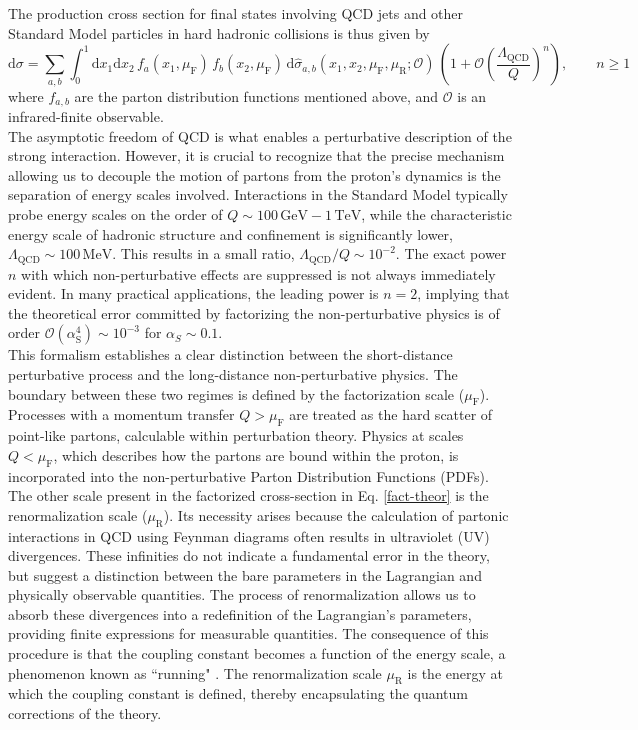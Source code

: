 \documentclass[a4paper, 12pt]{book}
\begin{document}
The production cross section for final states involving QCD jets and other Standard Model particles in hard hadronic collisions is thus given by
\begin{equation}
    \text{d}\sigma = \sum_{a, b} \int_0^1 \text{d}x_1 \text{d}x_2 \, f_{a}(x_1, \mu_\text{F}) \, f_{b}(x_2,\mu_\text{F}) \, \text{d}\hat \sigma_{a,b}(x_1,x_2,\mu_\text{F},\mu_\text{R};\mathcal{O}) \, \left(1+ \mathcal{O}\left(\frac{\Lambda_{\text{QCD}}}{Q} \right)^n \right), \qquad n\geq1
    \label{fact-theor}
\end{equation}
where $f_{a,b}$ are the parton distribution functions mentioned above, and $\mathcal{O}$ is an infrared-finite observable. \\
The asymptotic freedom of QCD is what enables a perturbative description of the strong interaction. However, it is crucial to recognize that the precise mechanism allowing us to decouple the motion of partons from the proton's dynamics is the separation of energy scales involved. Interactions in the Standard Model typically probe energy scales on the order of $Q \sim 100  \, \text{GeV} - 1 \, \text{TeV}$, while the characteristic energy scale of hadronic structure and confinement is significantly lower, $\Lambda_{\text{QCD}} \sim 100 \, \text{MeV}$. This results in a small ratio, $\Lambda_{\text{QCD}}/Q \sim 10^{-2}$. The exact power $n$ with which non-perturbative effects are suppressed is not always immediately evident. In many practical applications, the leading power is $n=2$, implying that the theoretical error committed by factorizing the non-perturbative physics is of order $\mathcal{O}(\alpha_{\text{S}}^4) \sim 10^{-3}$ for $\alpha_S \sim 0.1$. \\
This formalism establishes a clear distinction between the short-distance perturbative process and the long-distance non-perturbative physics. The boundary between these two regimes is defined by the factorization scale ($\mu_\text{F}$). Processes with a momentum transfer $Q > \mu_\text{F}$ are treated as the hard scatter of point-like partons, calculable within perturbation theory. Physics at scales $Q < \mu_\text{F}$, which describes how the partons are bound within the proton, is incorporated into the non-perturbative Parton Distribution Functions (PDFs). \\
The other scale present in the factorized cross-section in Eq. \ref{fact-theor} is the renormalization scale ($\mu_\text{R}$). Its necessity arises because the calculation of partonic interactions in QCD using Feynman diagrams often results in ultraviolet (UV) divergences. These infinities do not indicate a fundamental error in the theory, but suggest a distinction between the bare parameters in the Lagrangian and physically observable quantities. The process of renormalization allows us to absorb these divergences into a redefinition of the Lagrangian's parameters, providing finite expressions for measurable quantities. The consequence of this procedure is that the coupling constant becomes a function of the energy scale, a phenomenon known as ``running" \cite{ellis}. The renormalization scale $\mu_\text{R}$ is the energy at which the coupling constant is defined, thereby encapsulating the quantum corrections of the theory. \\
\end{document}
